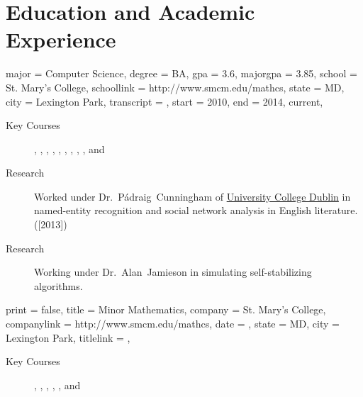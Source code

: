 \documentclass{bettercv}
\begin{document}
\section{Education and Academic Experience}
\begin{education}
  {
    major = Computer Science,
    degree = BA,
    gpa = 3.6,
    majorgpa = 3.85,
    school = St. Mary's College,
    schoollink = http://www.smcm.edu/mathcs,
    state = MD,
    city = Lexington Park,
    transcript = \transcript,
    start = 2010,
    end = 2014,
    current,
  }

\begin{description}
\item[Key Courses]
  ,
  ,
  ,
  ,
  ,
  ,
  ,
  ,
  ,
  and
\item[Research] Worked under
  Dr.~P\'adraig~Cunningham of \href{http://www.ucd.ie}{University
    College Dublin} in named-entity recognition and social network
  analysis in English literature. ([2013])
\item[Research] Working under Dr.~Alan~Jamieson in simulating
  self-stabilizing algorithms.
\end{description}
\end{education}

\begin{position}
  {
    print   = false,
    title   = Minor \Dash Mathematics,
    company = St. Mary's College,
    companylink = http://www.smcm.edu/mathcs,
    date    = ,
    state   = MD,
    city    = Lexington Park,
    titlelink = \transcript,
  }

  \begin{description}
  \item[Key Courses]
    ,
    ,
    ,
    ,
    ,
    and
  \end{description}
\end{position}
\end{document}
